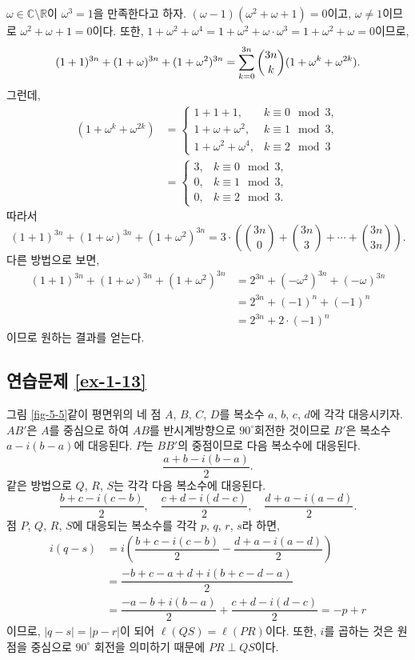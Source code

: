 $\omega\in\mathbb C\setminus \mathbb R$이 $\omega^3=1$을 만족한다고 하자.
$(\omega-1)(\omega^2+\omega+1)=0$이고,
$\omega\ne1$이므로 $\omega^2+\omega+1=0$이다.
또한, $1+\omega^2+\omega^4 = 1+ \omega^2 + \omega\cdot\omega^3 =
1+ \omega^2 + \omega = 0$이므로,
\[
(1+1)^{3n} + (1+\omega)^{3n} + (1+\omega^2)^{3n}
= \sum\limits_{k=0}^{3n} {3n \choose k} (1+\omega^k + \omega^{2k}).
\]
그런데,
\begin{align*}
(1+\omega^k + \omega^{2k})
&= \begin{cases}
1+1+1, & k\equiv 0 \mod 3, \\
1+\omega + \omega^2, & k\equiv 1 \mod 3, \\
1+\omega^2 + \omega^4,& k\equiv 2 \mod 3
\end{cases} \\
&=\begin{cases}
3, & k\equiv 0 \mod 3, \\
0, & k\equiv 1 \mod 3, \\
0, & k\equiv 2 \mod 3.
\end{cases}
\end{align*}
따라서
\[
(1+1)^{3n} + (1+\omega)^{3n} + (1+\omega^2)^{3n}
= 3\cdot \left(
{3n \choose 0} + {3n \choose 3} + \cdots + {3n \choose 3n} \right).
\]
다른 방법으로 보면,
\begin{align*}
(1+1)^{3n} + (1+\omega)^{3n} + (1+\omega^2)^{3n}
&= 2^{3n} + (-\omega^2)^{3n} +  (-\omega)^{3n} \\
&= 2^{3n} + (-1)^n + (-1)^n \\
&= 2^{3n} + 2\cdot(-1)^n
\end{align*}
이므로 원하는 결과를 얻는다.

\subsection*{연습문제 \ref{ex-1-13}}



그림 \ref{fig-5-5}\와 같이
평면위의 네 점 $A$, $B$, $C$, $D$를 복소수 $a$, $b$, $c$, $d$에 각각 대응시키자.
$AB'$은  $A$를 중심으로 하여 $AB$를 반시계방향으로 $90^\circ$회전한 것이므로
$B'$은 복소수 $a-i(b-a)$에 대응된다.
$P$는 $BB'$의 중점이므로 다음 복소수에 대응된다.
\[
\dfrac{a+b-i(b-a)}2.
\]
같은 방법으로 $Q$, $R$, $S$는 각각 다음 복소수에 대응된다.
\[
\dfrac{b+c-i(c-b)}2, \quad
\dfrac{c+d-i(d-c)}2, \quad
\dfrac{d+a-i(a-d)}2.
\]
점 $P$, $Q$, $R$, $S$에 대응되는 복소수를 각각
$p$, $q$, $r$, $s$라 하면,
\begin{align*}
i(q-s) &= i \left(
\dfrac{b+c-i(c-b)}2 - \dfrac{d+a-i(a-d)}2 \right) \\
&= \dfrac{-b+c-a+d+i(b+c-d-a)}2 \\
&= \dfrac{-a-b+i(b-a)}2 + \dfrac{c+d-i(d-c)}2 = -p+r
\end{align*}
이므로, $|q-s| = |p-r|$이 되어 $\ell(QS) = \ell(PR)$이다.
또한, $i$를 곱하는 것은 원점을 중심으로 $90^\circ$ 회전을 의미하기 때문에
$PR\perp QS$이다.

